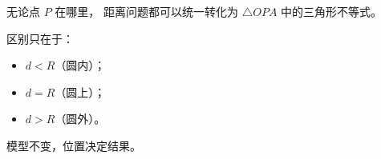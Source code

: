 \begin{explanationbox}
无论点 $P$ 在哪里，
距离问题都可以统一转化为
$\triangle OPA$ 中的三角形不等式。

区别只在于：
\begin{itemize}
  \item $d<R$（圆内）；
  \item $d=R$（圆上）；
  \item $d>R$（圆外）。
\end{itemize}

模型不变，位置决定结果。
\end{explanationbox}
